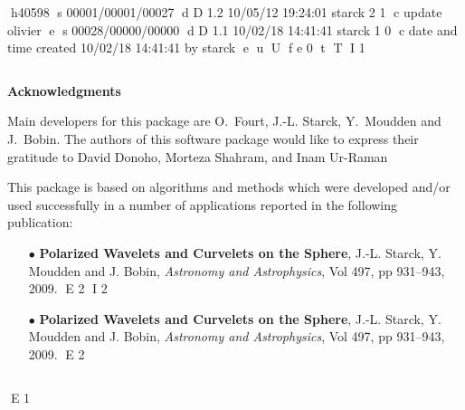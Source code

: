 h40598
s 00001/00001/00027
d D 1.2 10/05/12 19:24:01 starck 2 1
c update olivier
e
s 00028/00000/00000
d D 1.1 10/02/18 14:41:41 starck 1 0
c date and time created 10/02/18 14:41:41 by starck
e
u
U
f e 0
t
T
I 1

\newpage
\thispagestyle{empty}
$ $
\newpage

{\Huge \bf Acknowledgments}\label{forewd}\\
\vspace{1cm}

Main developers for this package are  O.~Fourt, J.-L. Starck, Y.~Moudden and  J.~Bobin.
The authors of this software package would like to express their 
gratitude to David Donoho, Morteza Shahram, and Inam Ur-Raman 

This package is based on algorithms and methods which were 
developed and/or used successfully in a number of applications 
reported in the following publication: \\
\begin{itemize}
D 2
\item[$\bullet$] { \textbf{Polarized Wavelets and Curvelets on the Sphere},  J.-L. Starck, Y. Moudden and J. Bobin,  \emph{Astronomy and Astrophysics}, Vol 497, pp 931--943, 2009.  }
E 2
I 2
\item[$\bullet$] {\textbf{Polarized Wavelets and Curvelets on the Sphere}, J.-L. Starck, Y. Moudden and J. Bobin, \textit{Astronomy and Astrophysics}, Vol 497, pp 931--943, 2009.}
E 2
\end{itemize}

\newpage
\thispagestyle{empty}
$ $
\newpage


E 1
